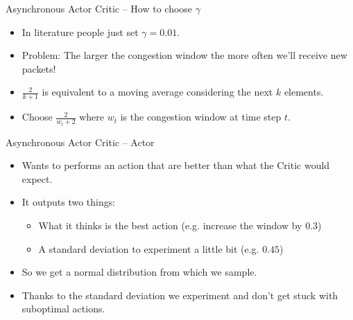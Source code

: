 \documentclass[11pt]{beamer}
\begin{document}
\makeatletter
{}
\makeatother

\begin{frame}{Asynchronous Actor Critic -- How to choose $\gamma$}
\begin{itemize}
\item In literature people just set $\gamma = 0.01$. 
\item Problem: The larger the congestion window the more often we'll receive new packets!
\item $\frac{2}{k+1}$ is equivalent to a moving average considering the next $k$ elements.
\item Choose $\frac{2}{w_t+2}$ where $w_t$ is the congestion window at time step $t$.
\end{itemize}
\end{frame}

\begin{frame}{Asynchronous Actor Critic -- Actor}
\begin{itemize}
\item Wants to performs an action that are better than what the Critic would expect.
\item It outputs two things:
\begin{itemize}
\item What it thinks is the best action (e.g. increase the window by $0.3$)
\item A standard deviation to experiment a little bit (e.g. $0.45$)
\end{itemize}
\item So we get a normal distribution from which we sample.
\item Thanks to the standard deviation we experiment and don't get stuck with suboptimal actions. 
\end{itemize}
\end{frame}
\end{document}

